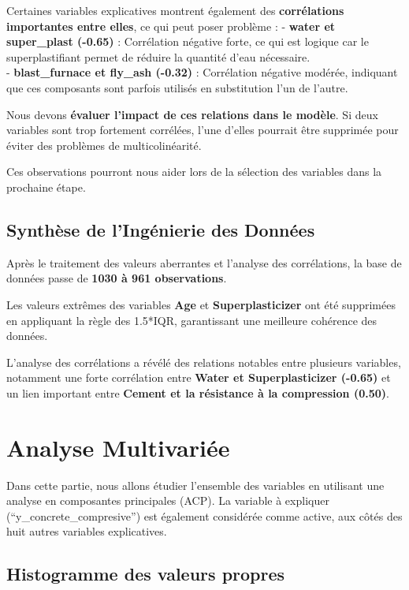 \documentclass[
  12pt,
]{article}
\begin{document}
Certaines variables explicatives montrent également des
\textbf{corrélations importantes entre elles}, ce qui peut poser
problème : - \textbf{water et super\_plast (-0.65)} : Corrélation
négative forte, ce qui est logique car le superplastifiant permet de
réduire la quantité d'eau nécessaire.\\
- \textbf{blast\_furnace et fly\_ash (-0.32)} : Corrélation négative
modérée, indiquant que ces composants sont parfois utilisés en
substitution l'un de l'autre.

Nous devons \textbf{évaluer l'impact de ces relations dans le modèle}.
Si deux variables sont trop fortement corrélées, l'une d'elles pourrait
être supprimée pour éviter des problèmes de multicolinéarité.

Ces observations pourront nous aider lors de la sélection des variables
dans la prochaine étape.

\subsection{Synthèse de l'Ingénierie des
Données}\label{synthuxe8se-de-linguxe9nierie-des-donnuxe9es}

Après le traitement des valeurs aberrantes et l'analyse des
corrélations, la base de données passe de \textbf{1030 à 961
observations}.

Les valeurs extrêmes des variables \textbf{Age} et
\textbf{Superplasticizer} ont été supprimées en appliquant la règle des
1.5*IQR, garantissant une meilleure cohérence des données.

L'analyse des corrélations a révélé des relations notables entre
plusieurs variables, notamment une forte corrélation entre \textbf{Water
et Superplasticizer (-0.65)} et un lien important entre \textbf{Cement
et la résistance à la compression (0.50)}.

\section{Analyse Multivariée}\label{analyse-multivariuxe9e}

Dans cette partie, nous allons étudier l'ensemble des variables en
utilisant une analyse en composantes principales (ACP). La variable à
expliquer (``y\_concrete\_compresive'') est également considérée comme
active, aux côtés des huit autres variables explicatives.

\subsection{Histogramme des valeurs
propres}\label{histogramme-des-valeurs-propres}
\end{document}
